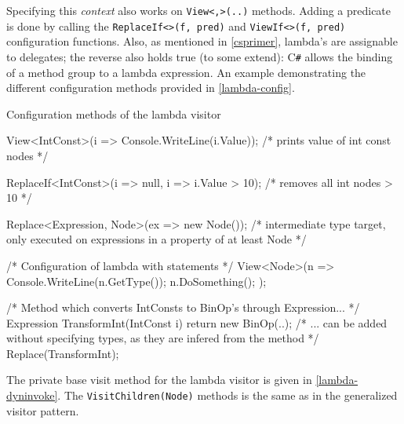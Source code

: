 \documentclass[twoside,openright]{uva-bachelor-thesis}
\newcommand{\code}[1]{\texttt{\footnotesize#1}}
\newcommand{\cs}{C\texttt{\#}\xspace}
\begin{document}
			Specifying this \emph{context} also works on \code{View<,>(..)} methods. Adding a predicate is done by calling the \code{ReplaceIf<>(f, pred)} and \code{ViewIf<>(f, pred)} configuration functions. Also, as mentioned in \cref{csprimer}, lambda's are assignable to delegates; the reverse also holds true (to some extend): \cs allows the binding of a method group to a lambda expression. An example demonstrating the different configuration methods provided in \cref{lambda-config}. 
			\begin{codebox}[label=lambda-config]{Configuration methods of the lambda visitor}
				\begin{csharpcode}
					View<IntConst>(i => Console.WriteLine(i.Value));    /* prints value of int const nodes */
					
					ReplaceIf<IntConst>(i => null, i => i.Value > 10);  /* removes all int nodes > 10 */
					
					Replace<Expression, Node>(ex => new Node());        /* intermediate type target, only 
					                                                       executed on expressions in a 
					                                                       property of at least Node */
					
					/* Configuration of lambda with statements */
					View<Node>(n =>
					{
						Console.WriteLine(n.GetType());
						n.DoSomething();
					});
					
					/* Method which converts IntConsts to BinOp's through Expression... */
					Expression TransformInt(IntConst i)
					{
						return new BinOp(..);
					}
					/* ... can be added without specifying types, as they are infered from the method */
					Replace(TransformInt);
				\end{csharpcode}
			\end{codebox}
			
			The private base visit method for the lambda visitor is given in \cref{lambda-dyninvoke}. The \code{VisitChildren(Node)} methods is the same as in the generalized visitor pattern.
			
\end{document}
